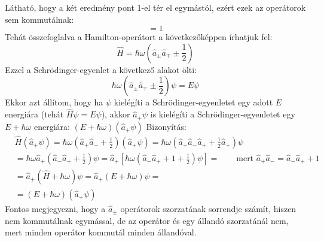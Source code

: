 \documentclass[a4paper,12pt]{article}
\begin{document}
Látható, hogy a két eredmény pont 1-el tér el egymástól, ezért ezek az operátorok sem kommutálnak:
\begin{equation}
    [\hat{a}_-, \hat{a}_+] = 1
\end{equation}
Tehát összefoglalva a Hamilton-operátort a következőképpen írhatjuk fel:
\begin{equation}
    \hat{H} = \hbar \omega \left( \hat{a}_\pm \hat{a}_\mp \pm \frac{1}{2} \right)
\end{equation}
Ezzel a Schrödinger-egyenlet a következő alakot ölti:
\begin{equation}
    \hbar \omega \left( \hat{a}_\pm \hat{a}_\mp \pm \frac{1}{2} \right) \psi = E \psi
\end{equation}
Ekkor azt állítom, hogy ha $\psi$ kielégíti a Schrödinger-egyenletet egy adott $E$ energiára (tehát $\hat{H} \psi = E \psi$), akkor
$\hat{a}_+\psi$ is kielégíti a Schrödinger-egyenletet egy $E + \hbar \omega$ energiára: $(E + \hbar \omega)(\hat{a}_+\psi)$
\newline
\newline
Bizonyítás:
\begin{equation}
    \begin{aligned}
    & \hat{H} (\hat{a}_+ \psi) = \hbar \omega \left( \hat{a}_+ \hat{a}_- + \frac{1}{2} \right) (\hat{a}_+ \psi) = \hbar \omega \left( \hat{a}_+ \hat{a}_- \hat{a}_+ + \frac{1}{2} \hat{a}_+  \right)\psi \\
    & = \hbar \omega \hat{a}_+ \left(\hat{a}_- \hat{a}_+ + \frac{1}{2}\right)\psi = \hat{a}_+ \left[\hbar \omega \left(\hat{a}_- \hat{a}_+ + 1 + \frac{1}{2}\right)\psi\right] = \quad \quad \text{mert } \hat{a}_+ \hat{a}_- = \hat{a}_- \hat{a}_+ + 1 \\
    & = \hat{a}_+ \left( \hat{H} + \hbar \omega \right) \psi = \hat{a}_+ (E + \hbar \omega) \psi = \\
    & = (E + \hbar \omega)(\hat{a}_+ \psi)
    \end{aligned}
\end{equation}
Fontos megjegyezni, hogy a $\hat{a}_\pm$ operátorok szorzatának sorrendje számít, hiszen nem kommutálnak egymással, de az operátor és egy állandó 
szorzatánál nem, mert minden operátor kommutál minden állandóval.
\end{document}
